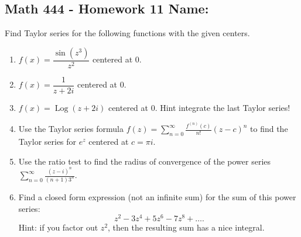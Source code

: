 \documentclass[11pt]{article}
\newcommand{\ds}{\displaystyle}
\newcommand{\on}{\operatorname}
\newcommand{\Log}{\on{Log}}
\begin{document}
\pagestyle{empty}
\subsection*{Math 444 - Homework 11 \hfill Name: \underline{\hspace*{2in}}}
\noindent
Find Taylor series for the following functions with the given centers.
\begin{enumerate}
\item $f(x) = \dfrac{\sin(z^3)}{z^2}$ centered at $0$.
\vfill

\item $f(x) = \dfrac{1}{z+2i}$ centered at $0$.
\vfill

\item $f(x) = \Log(z+2i)$ centered at $0$. Hint integrate the last Taylor series!
\vfill

\item Use the Taylor series formula $f(z) = \sum_{n = 0}^\infty \frac{f^{(n)}(c)}{n!} (z-c)^n$ to find the Taylor series for $e^z$ centered at $c= \pi i$.  
\vfill

\item Use the ratio test to find the radius of convergence of the power series $\ds \sum_{n = 0}^\infty \frac{(z-i)^n}{(n+1) 3^n}$.  
\vfill 

\item Find a closed form expression (not an infinite sum) for the sum of this power series: 
$$z^2 - 3z^4 + 5z^6 - 7z^8 + \ldots.$$
Hint: if you factor out $z^2$, then the resulting sum has a nice integral. 
\vfill
\end{enumerate}
\end{document}
